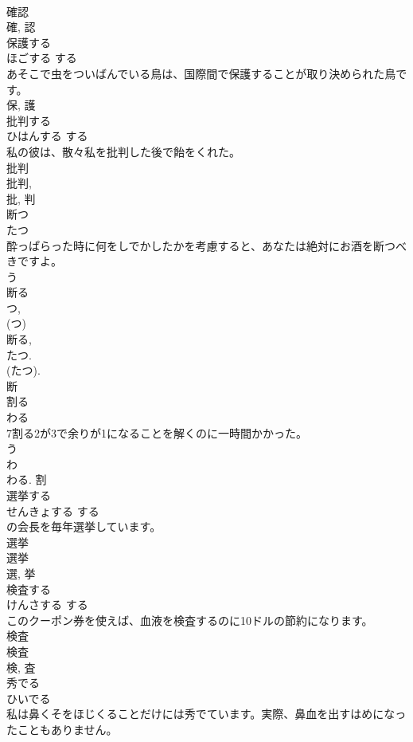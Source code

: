 \documentclass[8pt]{extreport}
\begin{document}
\begin{CJK}{UTF8}{min}
\\	確認 
\\	確, 認	
\\	保護する	
\\	ほごする	する 
\\	あそこで虫をついばんでいる鳥は、国際間で保護することが取り決められた鳥です。	
\\	保, 護	
\\	批判する	
\\	ひはんする	する 
\\	私の彼は、散々私を批判した後で飴をくれた。	
\\	批判 
\\	批判, 
\\	批, 判	
\\	断つ	
\\	たつ	
\\	酔っぱらった時に何をしでかしたかを考慮すると、あなたは絶対にお酒を断つべきですよ。	
\\	う 
\\	断る 
\\	つ, 
\\	(つ) 
\\	断る, 
\\	たつ. 
\\	(たつ). 
\\	断	
\\	割る	
\\	わる	
\\	7割る2が3で余りが1になることを解くのに一時間かかった。	
\\	う 
\\	わ 
\\	わる.	割	
\\	選挙する	
\\	せんきょする	する 
\\	の会長を毎年選挙しています。	
\\	選挙 
\\	選挙 
\\	選, 挙	
\\	検査する	
\\	けんさする	する 
\\	このクーポン券を使えば、血液を検査するのに10ドルの節約になります。	
\\	検査 
\\	検査 
\\	検, 査	
\\	秀でる	
\\	ひいでる	
\\	私は鼻くそをほじくることだけには秀でています。実際、鼻血を出すはめになったこともありません。	

\end{CJK}
\end{document}
